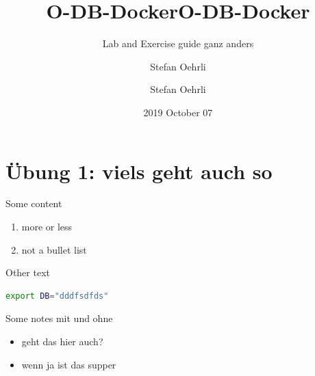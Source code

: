 \documentclass[
  a4paper,
,tablecaptionabove
]{scrartcl}
\title{O-DB-Docker}
\subtitle{Lab and Exercise guide ganz anders}
\author{Stefan Oehrli}
\date{2019 October 07}
\title{O-DB-Docker}
\author{Stefan Oehrli}
\providecommand{\tightlist}{%
  \setlength{\itemsep}{0pt}\setlength{\parskip}{0pt}}
\begin{document}
  \begin{titlepage}
    \newcommand{\colorRule}[3][black]{\textcolor[HTML]{#1}{\rule{#2}{#3}}}
\end{titlepage}
  \restoregeometry


    

      \renewcommand*\contentsname{Table of Contents}
        {
            \setcounter{tocdepth}{3}
      \tableofcontents
              \newpage
          }
  \hypertarget{uxfcbung-1-viels-geht-auch-so}{%
\section{Übung 1: viels geht auch
so}\label{uxfcbung-1-viels-geht-auch-so}}

Some content

\begin{enumerate}
\def\labelenumi{\arabic{enumi}.}
\tightlist
\item
  more or less
\item
  not a bullet list
\end{enumerate}

Other text

\begin{lstlisting}[language=bash]
export DB="dddfsdfds"
\end{lstlisting}

Some notes mit und ohne

\begin{itemize}
\tightlist
\item
  geht das hier auch?
\item
  wenn ja ist das supper
\end{itemize}
\end{document}

